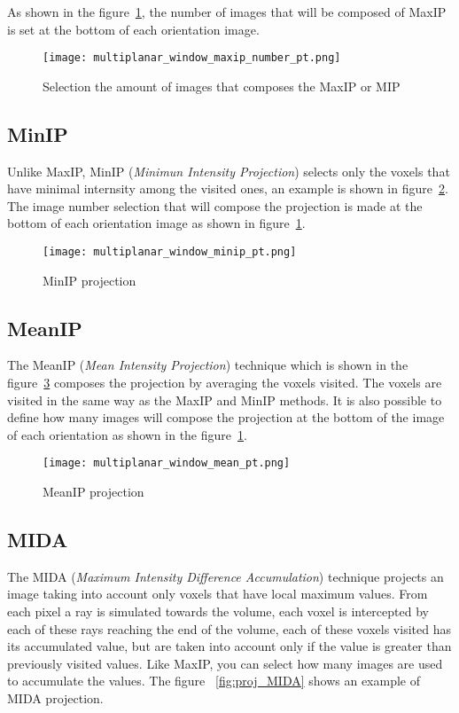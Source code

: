 As shown in the figure~\ref{fig:proj_maxip_qtd}, the number of images that will be composed of MaxIP is set at the bottom of each orientation image.

\begin{figure}[H]
\centering
\texttt{[image: multiplanar\_window\_maxip\_number\_pt.png]}
\caption{Selection the amount of images that composes the MaxIP or MIP}
\label{fig:proj_maxip_qtd}
\end{figure}

\subsection{MinIP}

Unlike MaxIP, MinIP (\textit{Minimun Intensity Projection}) selects only the voxels that have minimal internsity among the visited ones, an example is shown in figure~\ref{fig:proj_minIP}. The image number selection that will compose the projection is made at the bottom of each orientation image as shown in figure~\ref{fig:proj_maxip_qtd}.

\begin{figure}[H]
\centering
\texttt{[image: multiplanar\_window\_minip\_pt.png]}
\caption{MinIP projection}
\label{fig:proj_minIP}
\end{figure}

\subsection{MeanIP}
The MeanIP (\textit{Mean Intensity Projection}) technique which is shown in the figure~\ref{fig:proj_meanIP} composes the projection by averaging the voxels visited. The voxels are visited in the same way as the MaxIP and MinIP methods. It is also possible to define how many images will compose the projection at the bottom of the image of each orientation as shown in the figure~\ref{fig:proj_maxip_qtd}.

\begin{figure}[H]
\centering
\texttt{[image: multiplanar\_window\_mean\_pt.png]}
\caption{MeanIP projection}
\label{fig:proj_meanIP}
\end{figure}

\subsection{MIDA}
\label{sub:mida}
The MIDA (\textit{Maximum Intensity Difference Accumulation}) technique projects an image taking into account only voxels that have local maximum values. From each pixel a ray is simulated towards the volume, each voxel is intercepted by each of these rays reaching the end of the volume, each of these voxels visited has its accumulated value, but are taken into account only if the value is greater than previously visited values. Like MaxIP, you can select how many images are used to accumulate the values. The figure ~\ref{fig:proj_MIDA} shows an example of MIDA projection.

